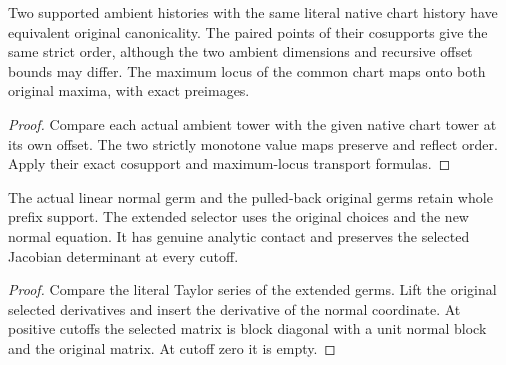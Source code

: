 \begin{theorem}
\label{hir:g1-cross-ambient-native-comparison}
\leanok
Two supported ambient histories with the same literal native
chart history have equivalent original canonicality. The
paired points of their cosupports give the same strict
order, although the two ambient dimensions and recursive
offset bounds may differ. The maximum locus of the common
chart maps onto both original maxima, with exact preimages.
\end{theorem}
\begin{proof}
Compare each actual ambient tower with the given native
chart tower at its own offset. The two strictly monotone
value maps preserve and reflect order. Apply their exact
cosupport and maximum-locus transport formulas.
\end{proof}

\begin{theorem}
\label{hir:g1-closed-normal-actual-selector}
\leanok
The actual linear normal germ and the pulled-back original
germs retain whole prefix support. The extended selector
uses the original choices and the new normal equation.
It has genuine analytic contact and preserves the selected
Jacobian determinant at every cutoff.
\end{theorem}
\begin{proof}
Compare the literal Taylor series of the extended germs.
Lift the original selected derivatives and insert the
derivative of the normal coordinate. At positive cutoffs
the selected matrix is block diagonal with a unit normal
block and the original matrix. At cutoff zero it is empty.
\end{proof}

